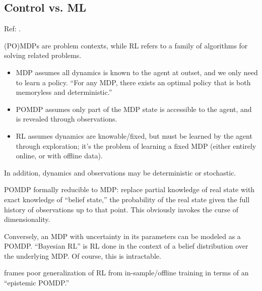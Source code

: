 \documentclass[notitlepage,openany,11pt]{report}
\theoremstyle{plain}%
\numberwithin{equation}{section}
\begin{document}
\subsection{Control vs. ML}
\label{sec-control-vs-ml}
Ref: \cite{NiEtAl:21}. 

(PO)MDPs are problem contexts, while RL refers to a family of algorithms for solving related problems.
\begin{itemize}
\item MDP assumes all dynamics is known to the agent at outset, and we only need to learn a policy. ``For any MDP, there exists an optimal policy that is both memoryless and deterministic.''  
\item POMDP assumes only part of the MDP state is accessible to the agent, and is revealed through observations.
\item RL assumes dynamics are knowable/fixed, but must be learned by the agent through exploration; it's the problem of learning a fixed MDP (either entirely online, or with offline data).
\end{itemize}
In addition, dynamics and observations may be deterministic or stochastic. 

POMDP formally reducible to MDP: replace partial knowledge of real state with exact knowledge of ``belief state,'' the probability of the real state given the full history of observations up to that point. This obviously invokes the curse of dimensionality.

Conversely, an MDP with uncertainty in its parameters can be modeled as a POMDP. ``Bayesian RL'' is RL done in the context of a belief distribution over the underlying MDP. Of course, this is intractable.

\cite{GhoshEtAl:21} frames poor generalization of RL from in-sample/offline training in terms of an ``epistemic POMDP.''
\end{document}
